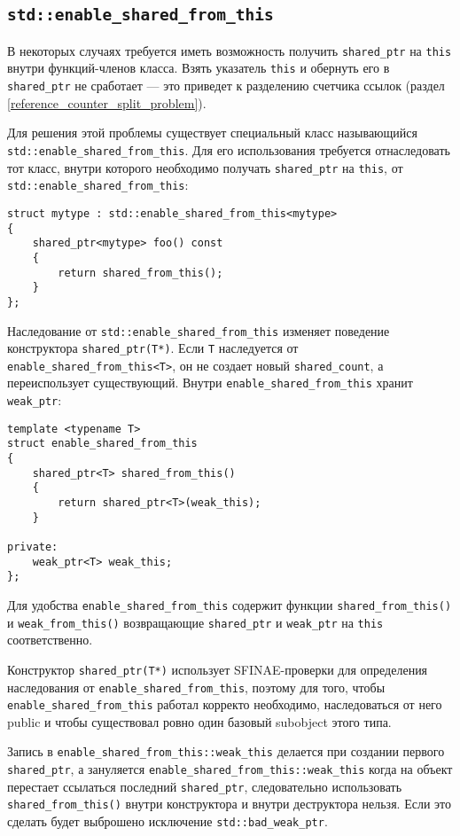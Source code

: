 \subsection{\texttt{std::enable_shared_from_this}}
\label{enable_shared_from_this}

В некоторых случаях требуется иметь возможность получить \texttt{shared_ptr} на \texttt{this} внутри функций-членов класса. Взять указатель \texttt{this} и обернуть его в \texttt{shared_ptr} не сработает --- это приведет к разделению счетчика ссылок (раздел \ref{reference_counter_split_problem}).

Для решения этой проблемы существует специальный класс называющийся \texttt{std::enable_shared_from_this}. Для его использования требуется отнаследовать тот класс, внутри которого необходимо получать \texttt{shared_ptr} на \texttt{this}, от \texttt{std::enable_shared_from_this}:

\begin{verbatim}
struct mytype : std::enable_shared_from_this<mytype>
{
    shared_ptr<mytype> foo() const
    {
        return shared_from_this();
    }
};
\end{verbatim}

Наследование от \texttt{std::enable_shared_from_this} изменяет поведение конструктора \texttt{shared_ptr(T*)}. Если \texttt{T} наследуется от \texttt{enable_shared_from_this<T>}, он не создает новый \texttt{shared_count}, а переиспользует существующий. Внутри \texttt{enable_shared_from_this} хранит \texttt{weak_ptr}:

\begin{verbatim}
template <typename T>
struct enable_shared_from_this
{
    shared_ptr<T> shared_from_this()
    {
        return shared_ptr<T>(weak_this);
    }

private:
    weak_ptr<T> weak_this;
};
\end{verbatim}

Для удобства \texttt{enable_shared_from_this} содержит функции \texttt{shared_from_this()} и \texttt{weak_from_this()} возвращающие \texttt{shared_ptr} и \texttt{weak_ptr} на \texttt{this} соответственно.

Конструктор \texttt{shared_ptr(T*)} использует SFINAE-проверки для определения наследования от \texttt{enable_shared_from_this}, поэтому для того, чтобы \texttt{enable_shared_from_this} работал корректо необходимо, наследоваться от него public и чтобы существовал ровно один базовый subobject этого типа.

Запись в \texttt{enable_shared_from_this::weak_this} делается при создании первого \texttt{shared_ptr}, а зануляется \texttt{enable_shared_from_this::weak_this} когда на объект перестает ссылаться последний \texttt{shared_ptr}, следовательно использовать \texttt{shared_from_this()} внутри конструктора и внутри деструктора нельзя. Если это сделать будет выброшено исключение \texttt{std::bad_weak_ptr}.
